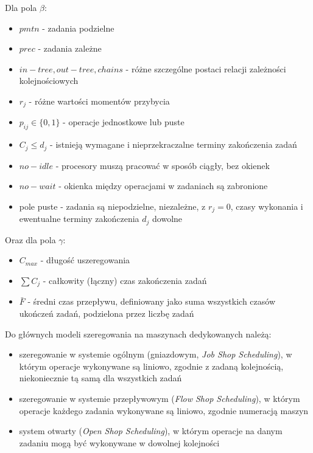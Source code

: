 \documentclass[brudnopis]{xmgr}
\begin{document}
Dla pola $\beta$:
\begin{itemize}
    \item $pmtn$ - zadania podzielne
    \item $prec$ - zadania zależne
    \item $in-tree, out-tree, chains$ - różne szczególne postaci relacji zależności kolejnościowych
    \item $r_j$ - różne wartości momentów przybycia
    \item $p_{ij}\in\{0,1\}$ - operacje jednostkowe lub puste
    \item $C_j\leq d_j$ - istnieją wymagane i nieprzekraczalne terminy zakończenia zadań
    \item $no-idle$ - procesory muszą pracować w sposób ciągły, bez okienek
    \item $no-wait$ - okienka między operacjami w zadaniach są zabronione
    \item pole puste - zadania są niepodzielne, niezależne, z $r_j=0$, czasy wykonania i ewentualne terminy zakończenia $d_j$ dowolne
\end{itemize}

Oraz dla pola $\gamma$:
\begin{itemize}
    \item $C_{max}$ - długość uszeregowania
    \item $\sum{C_j}$ - całkowity (łączny) czas zakończenia zadań
    \item $\bar{F}$ - średni czas przepływu, definiowany jako suma wszystkich czasów ukończeń zadań, podzielona przez liczbę zadań
\end{itemize}


Do głównych modeli szeregowania na maszynach dedykowanych należą:
\begin{itemize}
    \item szeregowanie w systemie ogólnym (gniazdowym, \emph{Job Shop Scheduling}), w którym operacje wykonywane są liniowo, zgodnie z zadaną kolejnością, niekoniecznie tą samą dla wszystkich zadań
    \item szeregowanie w systemie przepływowym (\emph{Flow Shop Scheduling}), w którym operacje każdego zadania wykonywane są liniowo, zgodnie numeracją maszyn
    \item system otwarty (\emph{Open Shop Scheduling}), w którym operacje na danym zadaniu mogą być wykonywane w dowolnej kolejności
\end{itemize}
\end{document}
